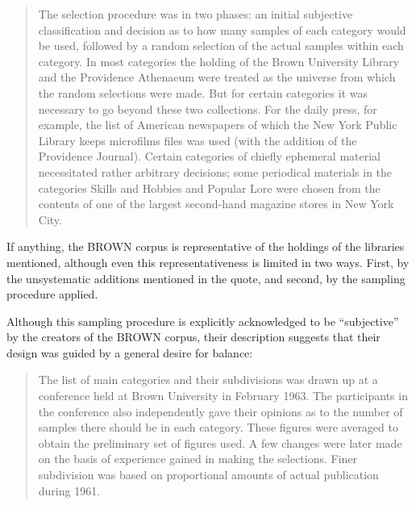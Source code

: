 \begin{quotation}
The selection procedure was in two phases: an initial subjective classification and decision as to how many samples of each category would be used, followed by a random selection of the actual samples within each category. In most categories the holding of the Brown University Library and the Providence Athenaeum were treated as the universe from which the random selections were made. But for certain categories it was necessary to go beyond these two collections. For the daily press, for example, the list of American newspapers of which the New York Public Library keeps microfilms files was used (with the addition of the Providence Journal). Certain categories of chiefly ephemeral material necessitated rather arbitrary decisions; some periodical materials in the categories Skills and Hobbies and Popular Lore were chosen from the contents of one of the largest second-hand magazine stores in New York City. \citep{francis_manual_1979}
\end{quotation}

If anything, the BROWN corpus is representative of the holdings of the libraries mentioned, although even this representativeness is limited in two ways. First, by the unsystematic additions mentioned in the quote, and second, by the sampling procedure applied.

Although this sampling procedure is explicitly acknowledged to be ``subjective'' by the creators of the BROWN corpus, their description suggests that their design was guided by a general desire for balance: 

\begin{quotation}
The list of main categories and their subdivisions was drawn up at a conference held at Brown University in February 1963. The participants in the conference also independently gave their opinions as to the number of samples there should be in each category. These figures were averaged to obtain the preliminary set of figures used. A few changes were later made on the basis of experience gained in making the selections. Finer subdivision was based on proportional amounts of actual publication during 1961. \citep{francis_manual_1979}
\end{quotation}


